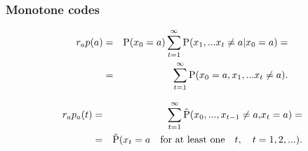 \documentclass[14pt]{beamer}
\begin{document}
\begin{frame}
\frametitle{Monotone codes}
\begin{itemize}    
\small{   

    \item 
    \begin{eqnarray*}
    r_a p(a) &=& {\rm P}(x_0 = a)\sum\limits_{t = 1}^\infty {{\rm P}(x_1 ,...x_t \ne a\vert x_0 = a)} = \\ 
    &=& \sum\limits_{t = 1}^\infty {{\rm P}(x_0 = a,x_1 ,...x_t \ne a)} .
    \end{eqnarray*}
    

    \item 
    \begin{eqnarray*}
     r_a p_a (t) &=& \sum\limits_{t = 1}^\infty {\tilde {{\rm P}}(x_0 ,...,x_{t - 1} \ne a,} x_t = a) =\\
    & =& \tilde {{\rm P}}(x_t =a \quad \mbox{for at least one} \quad t, \quad t = 1,2,...).
    \end{eqnarray*}
}    
\end{itemize}
\end{frame}


\end{document}
